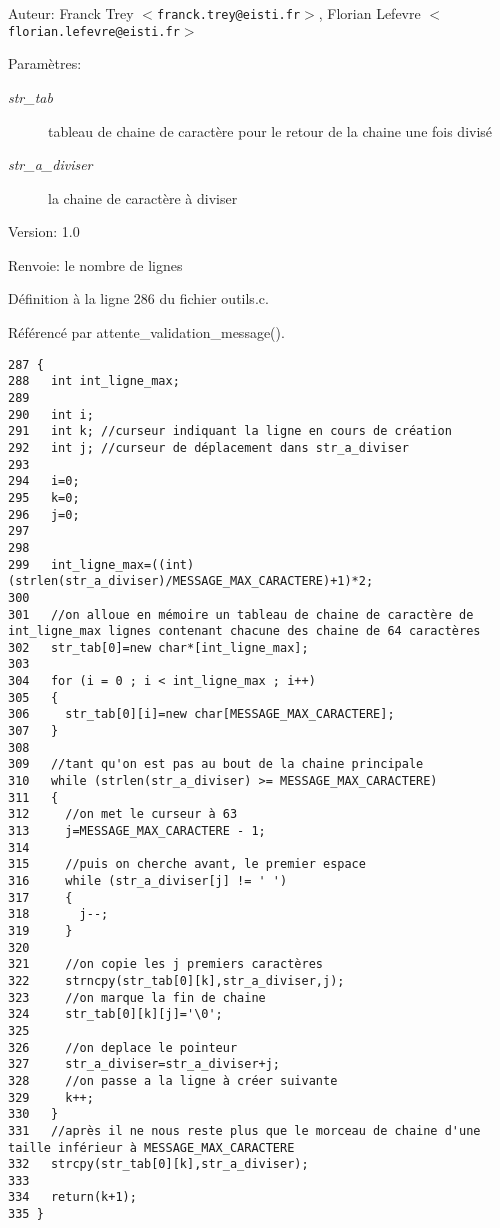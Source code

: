 \begin{Desc}
\item[Auteur:]Franck Trey $<${\tt franck.trey@eisti.fr}$>$, Florian Lefevre $<${\tt florian.lefevre@eisti.fr}$>$\end{Desc}
\begin{Desc}
\item[Param\`{e}tres:]
\begin{description}
\item[{\em str\_\-tab}]tableau de chaine de caract\`{e}re pour le retour de la chaine une fois divis\'{e} \item[{\em str\_\-a\_\-diviser}]la chaine de caract\`{e}re \`{a} diviser\end{description}
\end{Desc}
\begin{Desc}
\item[Version:]1.0 \end{Desc}
\begin{Desc}
\item[Renvoie:]le nombre de lignes \end{Desc}


D\'{e}finition \`{a} la ligne 286 du fichier outils.c.

R\'{e}f\'{e}renc\'{e} par attente\_\-validation\_\-message().

\begin{Code}\begin{verbatim}287 {
288   int int_ligne_max;
289   
290   int i;
291   int k; //curseur indiquant la ligne en cours de création
292   int j; //curseur de déplacement dans str_a_diviser
293 
294   i=0;
295   k=0;
296   j=0;
297 
298 
299   int_ligne_max=((int)(strlen(str_a_diviser)/MESSAGE_MAX_CARACTERE)+1)*2;
300   
301   //on alloue en mémoire un tableau de chaine de caractère de int_ligne_max lignes contenant chacune des chaine de 64 caractères
302   str_tab[0]=new char*[int_ligne_max];
303   
304   for (i = 0 ; i < int_ligne_max ; i++)
305   {
306     str_tab[0][i]=new char[MESSAGE_MAX_CARACTERE];
307   }
308   
309   //tant qu'on est pas au bout de la chaine principale
310   while (strlen(str_a_diviser) >= MESSAGE_MAX_CARACTERE)
311   {
312     //on met le curseur à 63
313     j=MESSAGE_MAX_CARACTERE - 1;
314     
315     //puis on cherche avant, le premier espace
316     while (str_a_diviser[j] != ' ')
317     {
318       j--;
319     }
320     
321     //on copie les j premiers caractères
322     strncpy(str_tab[0][k],str_a_diviser,j);
323     //on marque la fin de chaine
324     str_tab[0][k][j]='\0';
325     
326     //on deplace le pointeur
327     str_a_diviser=str_a_diviser+j;
328     //on passe a la ligne à créer suivante
329     k++;
330   }
331   //après il ne nous reste plus que le morceau de chaine d'une taille inférieur à MESSAGE_MAX_CARACTERE
332   strcpy(str_tab[0][k],str_a_diviser);
333   
334   return(k+1);
335 }
\end{verbatim}\end{Code}


